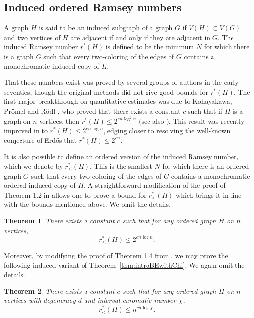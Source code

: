 \documentclass[11pt]{article}
\newtheorem{theorem}{Theorem}[section]
\begin{document}
\subsection{Induced ordered Ramsey numbers}

A graph $H$ is said to be an induced subgraph of a graph $G$ if $V(H) \subset V(G)$ and two vertices of $H$ are adjacent if and only if they are adjacent in $G$. The induced Ramsey number $r^*(H)$ is defined to be the minimum $N$ for which there is a graph $G$ such that every two-coloring of the edges of $G$ contains a monochromatic induced copy of $H$. 

That these numbers exist was proved by several groups of authors in the early seventies, though the original methods did not give good bounds for $r^*(H)$. The first major breakthrough on quantitative estimates was due to Kohayakawa, Pr\"omel and R\"odl \cite{KPR98}, who proved that there exists a constant $c$ such that if $H$ is a graph on $n$ vertices, then $r^*(H) \leq 2^{c n \log^2 n}$ (see also \cite{FS08}). This result was recently improved in \cite{CFS12} to $r^*(H) \leq 2^{c n \log n}$, edging closer to resolving the well-known conjecture of Erd\H{o}s that $r^*(H) \leq 2^{c n}$.

It is also possible to define an ordered version of the induced Ramsey number, which we denote by $r_{<}^*(H)$. This is the smallest $N$ for which there is an ordered graph $G$ such that every two-coloring of the edges of $G$ contains a monochromatic ordered induced copy of $H$. A straightforward modification of the proof of Theorem 1.2 in \cite{CFS12} allows one to prove a bound for $r_<^*(H)$ which brings it in line with the bounds mentioned above. We omit the details.

\begin{theorem}
There exists a constant $c$ such that for any ordered graph $H$ on $n$ vertices,
\[r^*_<(H) \leq 2^{c n \log n}.\]
\end{theorem}

Moreover, by modifying the proof of Theorem 1.4 from \cite{FS08}, we may prove the following induced variant of Theorem~\ref{thm:introBEwithChi}. We again omit the details.

\begin{theorem}
There exists a constant $c$ such that for any ordered graph $H$ on $n$ vertices with degeneracy $d$ and interval chromatic number $\chi$, 
\[r_<^*(H) \leq n^{c d \log \chi}.\]
\end{theorem}
\end{document}
